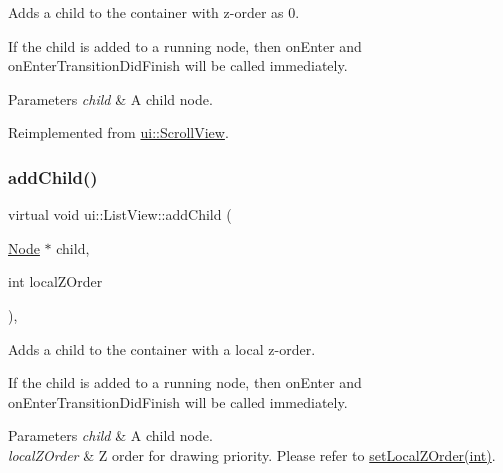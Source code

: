 Adds a child to the container with z-\/order as 0.

If the child is added to a \textquotesingle{}running\textquotesingle{} node, then \textquotesingle{}on\+Enter\textquotesingle{} and \textquotesingle{}on\+Enter\+Transition\+Did\+Finish\textquotesingle{} will be called immediately.


\begin{DoxyParams}{Parameters}
{\em child} & A child node. \\
\hline
\end{DoxyParams}


Reimplemented from \hyperlink{classui_1_1ScrollView_a6cdee934880e71245c6f5e6a2789c48a}{ui\+::\+Scroll\+View}.

\mbox{\label{classui_1_1ListView_afb7109d348b36c0d672066589ef1e00b}} 
\subsubsection{\texorpdfstring{add\+Child()}{addChild()}\hspace{0.1cm}{\footnotesize\ttfamily [6/8]}}
{\footnotesize\ttfamily virtual void ui\+::\+List\+View\+::add\+Child (\begin{DoxyParamCaption}\item[{\hyperlink{classNode}{Node} $\ast$}]{child,  }\item[{int}]{local\+Z\+Order }\end{DoxyParamCaption})\hspace{0.3cm}{\ttfamily [override]}, {\ttfamily [virtual]}}

Adds a child to the container with a local z-\/order.

If the child is added to a \textquotesingle{}running\textquotesingle{} node, then \textquotesingle{}on\+Enter\textquotesingle{} and \textquotesingle{}on\+Enter\+Transition\+Did\+Finish\textquotesingle{} will be called immediately.


\begin{DoxyParams}{Parameters}
{\em child} & A child node. \\
\hline
{\em local\+Z\+Order} & Z order for drawing priority. Please refer to {\ttfamily \hyperlink{classNode_aee4e616c2d55b722226aae1e68b4946f}{set\+Local\+Z\+Order(int)}}. \\
\hline
\end{DoxyParams}


